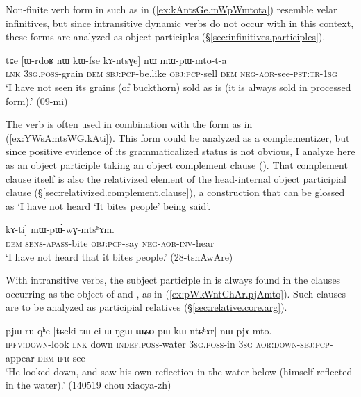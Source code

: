 Non-finite verb form in  such as  in (\ref{ex:kAntsGe.mWpWmtota}) resemble velar infinitives, but since intransitive dynamic verbs do not occur with  in this context, these forms are analyzed as object participles (§\ref{sec:infinitives.participles}).


\begin{exe}
\ex \label{ex:kAntsGe.mWpWmtota}
 \gll tɕe [ɯ-rdoʁ nɯ kɯ-fse kɤ-ntsɣe] nɯ mɯ-pɯ-mto-t-a  \\
 \textsc{lnk} \textsc{3sg}.\textsc{poss}-grain \textsc{dem} \textsc{sbj}:\textsc{pcp}-be.like \textsc{obj}:\textsc{pcp}-sell \textsc{dem} \textsc{neg}-\textsc{aor}-see-\textsc{pst}:\textsc{tr}-\textsc{1sg} \\
 \glt `I have not seen its grains (of buckthorn) sold as is (it is always sold in processed form).' (09-mi)
\end{exe}

The verb  is often used in combination with the form  as in (\ref{ex:YWsAmtsWG.kAti}). This form could be analyzed as a complementizer, but since positive evidence of its grammaticalized status is not obvious, I analyze  here as an object participle taking an object complement clause (). That complement clause itself is also the relativized element of the head-internal object participial clause  (§\ref{sec:relativized.complement.clause}), a construction that can be glossed as `I have not heard `It bites people' being said'.

\begin{exe}
\ex \label{ex:YWsAmtsWG.kAti}
 \gll [[nɯ ɲɯ-sɤ-mtsɯɣ] kɤ-ti] mɯ-pɯ́-wɣ-mtsʰɤm. \\
 \textsc{dem} \textsc{sens}-\textsc{apass}-bite \textsc{obj}:\textsc{pcp}-say \textsc{neg}-\textsc{aor}-\textsc{inv}-hear \\
 \glt `I have not heard that it bites people.' (28-tshAwAre)
\end{exe}
 
With intransitive verbs, the subject participle in  is always found in the clauses occurring as the object of  and , as in (\ref{ex:pWkWntChAr.pjAmto}). Such clauses are to be analyzed as participial relatives (§\ref{sec:relative.core.arg}).

\begin{exe}
\ex \label{ex:pWkWntChAr.pjAmto}
 \gll pjɯ-ru qʰe [tɕeki tɯ-ci ɯ-ŋgɯ \textbf{ɯʑo} pɯ-kɯ-ntɕʰɤr] nɯ pjɤ-mto. \\
 \textsc{ipfv}:\textsc{down}-look \textsc{lnk} down \textsc{indef}.\textsc{poss}-water \textsc{3sg}.\textsc{poss}-in \textsc{3sg} \textsc{aor}:\textsc{down}-\textsc{sbj}:\textsc{pcp}-appear \textsc{dem} \textsc{ifr}-see \\
 \glt  `He looked down, and saw his own reflection in the water below (himself reflected in the water).' (140519 chou xiaoya-zh)
 \end{exe}
 
